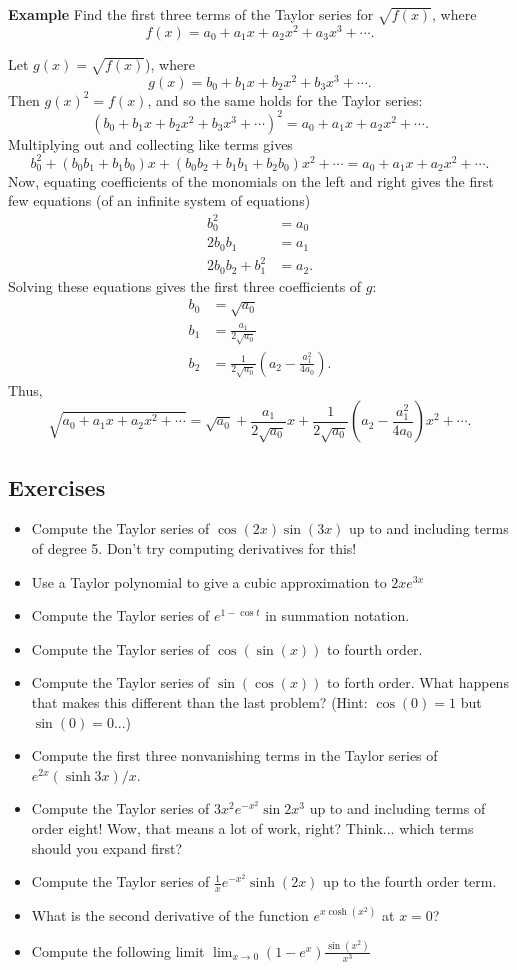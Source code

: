 \documentclass[twoside,openright,titlepage,a4paper]{book}
\begin{document}
\begin{sloppypar}
\textbf{Example} Find the first three terms of the Taylor series for ${\sqrt{f(x)}}$, where \[f(x)=a_0+a_1 x+a_2 x^2+a_3x^3+\dotsb.\]
\begin{examplebox}
Let ${g(x)=\sqrt{f(x)}}$), where \[g(x)=b_0+b_1 x+b_2 x^2+b_3 x^3+\dotsb.\]
Then ${g(x)^2=f(x)}$, and so the same holds for the Taylor series: \[\left(b_0+b_1 x+b_2 x^2+b_3 x^3+\dotsb\right)^2=a_0+a_1 x+a_2 x^2+\dotsb.\]
Multiplying out and collecting like terms gives \[b_0^2+(b_0b_1+b_1b_0)x+(b_0b_2+b_1b_1+b_2b_0) x^2+\dotsb=a_0+a_1 x+a_2 x^2+\dotsb.\]
Now, equating coefficients of the monomials on the left and right gives the first few equations (of an infinite system of equations)
\begin{align*}
b_0^2 &= a_0 \\ 
2b_0b_1 &= a_1 \\
2b_0b_2 + b_1^2 &= a_2.
\end{align*}
Solving these equations gives the first three coefficients of $g$:
\begin{align*}
b_0 &= \sqrt{a_0} \\
b_1 &= \frac{a_1}{2 \sqrt{a_0}} \\
b_2 &= \frac{1}{2\sqrt{a_0}}\left(a_2-\frac{a_1^2}{4a_0}\right).
\end{align*}
Thus, \[\sqrt{a_0+a_1 x+a_2 x^2+\dotsb}=\sqrt{a_0}+\frac{a_1}{2\sqrt{a_0}}x+\frac{1}{2\sqrt{a_0}}\left(a_2-\frac{a_1^2}{4a_0}\right)x^2+\dotsb.\]
\end{examplebox}
	
\subsection{Exercises}
\begin{itemize}
\item Compute the Taylor series of ${\cos(2x)\sin(3x)}$ up to and including terms of degree 5. Don't try computing derivatives for this!
\item Use a Taylor polynomial to give a cubic approximation to ${2xe^{3x}}$
\item Compute the Taylor series of ${e^{1-\cos t}}$ in summation notation.
\item Compute the Taylor series of ${\cos(\sin(x))}$ to fourth order.
\item Compute the Taylor series of ${\sin(\cos(x))}$ to forth order. What happens that makes this different than the last problem? (Hint: ${\cos(0)=1}$ but ${\sin(0)=0}$...)
\item Compute the first three nonvanishing terms in the Taylor series of ${e^{2x}(\sinh 3x)/x}$.
\item Compute the Taylor series of ${3x^2 e^{-x^2} \sin 2x^3}$ up to and including terms of order eight! Wow, that means a lot of work, right? Think... which terms should you expand first?
\item Compute the Taylor series of ${\frac{1}{x}e^{-x^2}\sinh(2x)}$ up to the fourth order term.
\item What is the second derivative of the function ${e^{x\cosh(x^2)}}$ at ${x=0}$?
\item Compute the following limit ${\lim_{x\to0}(1-e^x)\frac{\sin(x^2)}{x^3}}$
\end{itemize}


\end{sloppypar}
\end{document}
